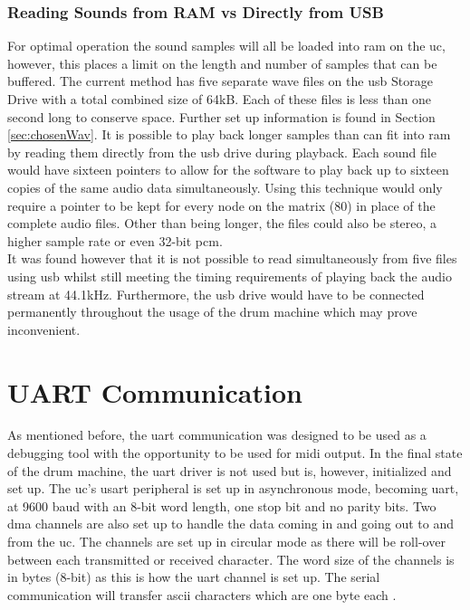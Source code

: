 \documentclass[12pt,a4paper]{report}
\begin{document}
\subsubsection{Reading Sounds from RAM vs Directly from USB} \label{sec:readUSB}
For optimal operation the sound samples will all be loaded into \ac{ram} on the \ac{uc}, however, this places a limit on the length and number of samples that can be buffered. The current method has five separate wave files on the \ac{usb} Storage Drive with a total combined size of 64kB. Each of these files is less than one second long to conserve space. Further set up information is found in Section \ref{sec:chosenWav}. It is possible to play back longer samples than can fit into \ac{ram} by reading them directly from the \ac{usb} drive during playback. Each sound file would have sixteen pointers to allow for the software to play back up to sixteen copies of the same audio data simultaneously. Using this technique would only require a pointer to be kept for every node on the matrix (80) in place of the complete audio files. Other than being longer, the files could also be stereo, a higher sample rate or even 32-bit \ac{pcm}. \\
It was found however that it is not possible to read simultaneously from five files using \ac{usb} whilst still meeting the timing requirements of playing back the audio stream at 44.1kHz. Furthermore, the \ac{usb} drive would have to be connected permanently throughout the usage of the drum machine which may prove inconvenient.
\section{UART Communication}
As mentioned before, the \ac{uart} communication was designed to be used as a debugging tool with the opportunity to be used for \ac{midi} output. In the final state of the drum machine, the \ac{uart} driver is not used but is, however, initialized and set up. The \ac{uc}'s \ac{usart} peripheral \cite{f411brd} is set up in asynchronous mode, becoming \ac{uart}, at 9600 \ac{baud} with an 8-bit word length, one stop bit and no parity bits. Two \ac{dma} channels are also set up to handle the data coming in and going out to and from the \ac{uc}. The channels are set up in circular mode as there will be roll-over between each transmitted or received character. The word size of the channels is in bytes (8-bit) as this is how the \ac{uart} channel is set up. The serial communication will transfer \ac{ascii} characters which are one byte each \cite{ascii}. 
\end{document}
